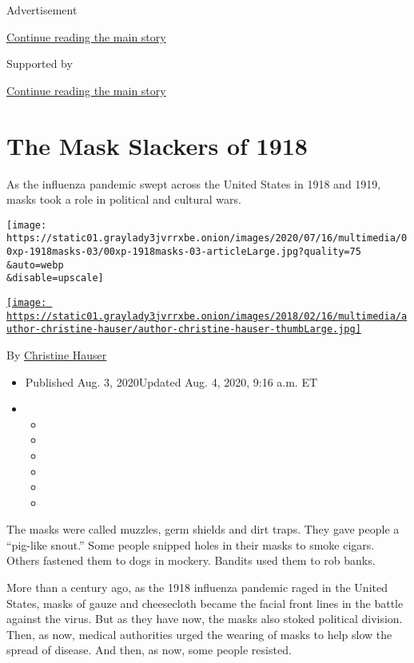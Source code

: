 Advertisement

\protect\hyperlink{after-top}{Continue reading the main story}

Supported by

\protect\hyperlink{after-sponsor}{Continue reading the main story}

\hypertarget{the-mask-slackers-of-1918}{%
\section{The Mask Slackers of 1918}\label{the-mask-slackers-of-1918}}

As the influenza pandemic swept across the United States in 1918 and
1919, masks took a role in political and cultural wars.

\texttt{[image: https://static01.graylady3jvrrxbe.onion/images/2020/07/16/multimedia/00xp-1918masks-03/00xp-1918masks-03-articleLarge.jpg?quality=75\\\&auto=webp\\\&disable=upscale]}

\href{https://www.nytimes3xbfgragh.onion/by/christine-hauser}{\texttt{[image: https://static01.graylady3jvrrxbe.onion/images/2018/02/16/multimedia/author-christine-hauser/author-christine-hauser-thumbLarge.jpg]}}

By
\href{https://www.nytimes3xbfgragh.onion/by/christine-hauser}{Christine
Hauser}

\begin{itemize}
\item
  Published Aug. 3, 2020Updated Aug. 4, 2020, 9:16 a.m. ET
\item
  \begin{itemize}
  \item
  \item
  \item
  \item
  \item
  \item
  \end{itemize}
\end{itemize}

The masks were called muzzles, germ shields and dirt traps. They gave
people a ``pig-like snout.'' Some people snipped holes in their masks to
smoke cigars. Others fastened them to dogs in mockery. Bandits used them
to rob banks.

More than a century ago, as the 1918 influenza pandemic raged in the
United States, masks of gauze and cheesecloth became the facial front
lines in the battle against the virus. But as they have now, the masks
also stoked political division. Then, as now, medical authorities urged
the wearing of masks to help slow the spread of disease. And then, as
now, some people resisted.


